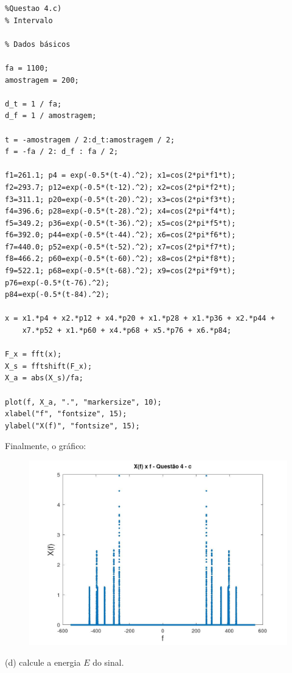 \documentclass[10pt]{article}
\begin{document}
\begin{verbatim}
%Questao 4.c)
% Intervalo

% Dados básicos

fa = 1100;
amostragem = 200;

d_t = 1 / fa;
d_f = 1 / amostragem;

t = -amostragem / 2:d_t:amostragem / 2;
f = -fa / 2: d_f : fa / 2;

f1=261.1; p4 = exp(-0.5*(t-4).^2); x1=cos(2*pi*f1*t);
f2=293.7; p12=exp(-0.5*(t-12).^2); x2=cos(2*pi*f2*t);
f3=311.1; p20=exp(-0.5*(t-20).^2); x3=cos(2*pi*f3*t);
f4=396.6; p28=exp(-0.5*(t-28).^2); x4=cos(2*pi*f4*t);
f5=349.2; p36=exp(-0.5*(t-36).^2); x5=cos(2*pi*f5*t);
f6=392.0; p44=exp(-0.5*(t-44).^2); x6=cos(2*pi*f6*t);
f7=440.0; p52=exp(-0.5*(t-52).^2); x7=cos(2*pi*f7*t);
f8=466.2; p60=exp(-0.5*(t-60).^2); x8=cos(2*pi*f8*t);
f9=522.1; p68=exp(-0.5*(t-68).^2); x9=cos(2*pi*f9*t);
p76=exp(-0.5*(t-76).^2);
p84=exp(-0.5*(t-84).^2);

x = x1.*p4 + x2.*p12 + x4.*p20 + x1.*p28 + x1.*p36 + x2.*p44 + 
    x7.*p52 + x1.*p60 + x4.*p68 + x5.*p76 + x6.*p84;

F_x = fft(x);
X_s = fftshift(F_x);
X_a = abs(X_s)/fa;

plot(f, X_a, ".", "markersize", 10);
xlabel("f", "fontsize", 15);
ylabel("X(f)", "fontsize", 15);
\end{verbatim}

Finalmente, o gráfico:
\begin{figure}[h]
    \includegraphics[scale=0.3]{questao4c.jpg}
    \centering
\end{figure}

(d) calcule a energia $E$ do sinal.
\end{document}
